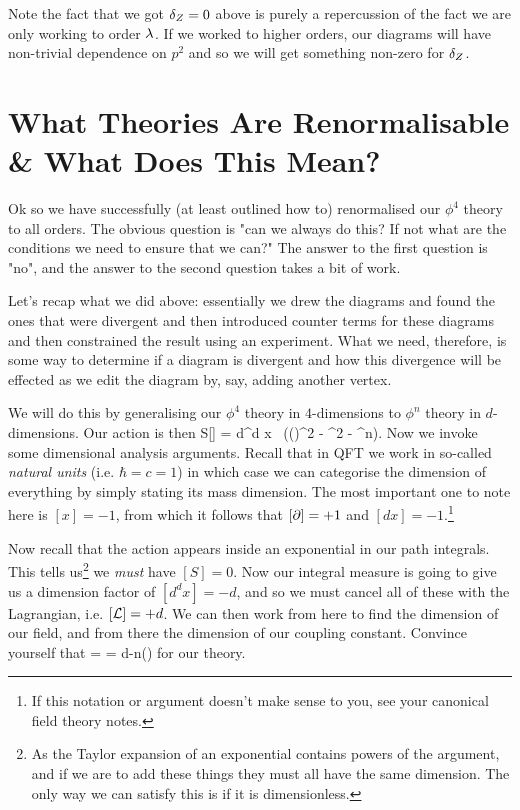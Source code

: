 \br 
    Note the fact that we got $\delta_Z=0$ above is purely a repercussion of the fact we are only working to order $\lambda$. If we worked to higher orders, our diagrams will have non-trivial dependence on $p^2$ and so we will get something non-zero for $\delta_Z$.
\er 

\section{What Theories Are Renormalisable \& What Does This Mean?}

Ok so we have successfully (at least outlined how to) renormalised our $\phi^4$ theory to all orders. The obvious question is "can we always do this? If not what are the conditions we need to ensure that we can?" The answer to the first question is "no", and the answer to the second question takes a bit of work. 

Let's recap what we did above: essentially we drew the diagrams and found the ones that were divergent and then introduced counter terms for these diagrams and then constrained the result using an experiment. What we need, therefore, is some way to determine if a diagram is divergent and how this divergence will be effected as we edit the diagram by, say, adding another vertex.

We will do this by generalising our $\phi^4$ theory in $4$-dimensions to $\phi^n$ theory in $d$-dimensions. Our action is then
\bse 
    S[\phi] = \int d^d x \, \bigg((\p\phi)^2 - \phi^2 -  \phi^n\bigg).
\ese 
Now we invoke some dimensional analysis arguments. Recall that in QFT we work in so-called \textit{natural units} (i.e. $\hbar=c=1$) in which case we can categorise the dimension of everything by simply stating its mass dimension. The most important one to note here is $[x]=-1$, from which it follows that $[\partial]=+1$ and $[dx]=-1$.\footnote{If this notation or argument doesn't make sense to you, see your canonical field theory notes.} 

Now recall that the action appears inside an exponential in our path integrals. This tells us\footnote{As the Taylor expansion of an exponential contains powers of the argument, and if we are to add these things they must all have the same dimension. The only way we can satisfy this is if it is dimensionless.} we \textit{must} have $[S]=0$. Now our integral measure is going to give us a dimension factor of $[d^dx]=-d$, and so we must cancel all of these with the Lagrangian, i.e. $[\mathcal{L}]=+d$. We can then work from here to find the dimension of our field, and from there the dimension of our coupling constant. 
\bbox 
    Convince yourself that 
    \bse 
        [\phi]=  \qquad \implies \qquad [\l] = d-n\bigg(\bigg)
    \ese
    for our theory. 
\ebox 

